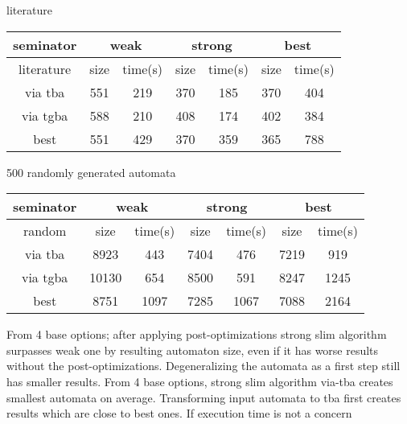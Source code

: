 \documentclass[
	digital
nolof, nolot
]{fithesis3}
\begin{document}
	literature
	\begin{center}
		\begin{tabular}{ |c||c|c|c|c|c|c| } 
			\hline
			seminator&\multicolumn{2}{c|}{weak}&\multicolumn{2}{c|}{strong}&\multicolumn{2}{c|}{best} \\
			\hline
			literature&size&time(s)&size&time(s)&size&time(s)\\
			\hhline{|=======|}
			
			via tba&551&219& 370 &185& 370&404\\
			\hline
			via tgba&588&210& 408&174& 402&384\\ 
			\hline
			best&551&429& 370&359& 365&788 \\ 
			\hline
		\end{tabular}
	\end{center}
	
	500 randomly generated automata
	\begin{center}
		\begin{tabular}{ |c|c|c|c|c|c|c| } 
			\hline
			seminator&\multicolumn{2}{c|}{weak}&\multicolumn{2}{c|}{strong}&\multicolumn{2}{c|}{best} \\
			\hline
			random&size&time(s)&size&time(s)&size&time(s)\\
			\hline
			via tba&8923&443& 7404 &476& 7219&919\\
			\hline
			via tgba&10130&654& 8500&591& 8247&1245\\ 
			\hline
			best&8751&1097& 7285&1067& 7088&2164 \\ 
			\hline
		\end{tabular}
	\end{center}
	
	From 4 base options; after applying post-optimizations strong slim algorithm surpasses weak one by resulting automaton size, even if it has worse results without the post-optimizations.
	Degeneralizing the automata as a first step still has smaller results.
	From 4 base options, strong slim algorithm via-tba creates smallest automata on average.
	Transforming input automata to tba first creates results which are close to best ones. If execution time is not a concern
	
\end{document}
